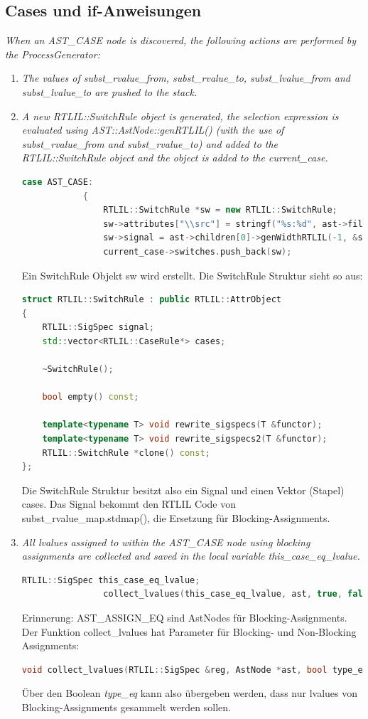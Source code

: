 \documentclass[11pt]{report}
\begin{document}
\subsection{Cases und if-Anweisungen}

\textit{When an AST\_CASE node is discovered, the following actions are performed by the ProcessGenerator:}
\begin{enumerate}
  \item \textit{The values of subst\_rvalue\_from, subst\_rvalue\_to, subst\_lvalue\_from and subst\_lvalue\_to are pushed to the stack.}

  
\item \textit{A new RTLIL::SwitchRule object is generated, the selection expression is evaluated using AST::AstNode::genRTLIL() (with the use of subst\_rvalue\_from and subst\_rvalue\_to) and added to the RTLIL::SwitchRule object and the object is added to the current\_case.}
  \begin{lstlisting}[language=C++]
  	case AST_CASE:
			{
				RTLIL::SwitchRule *sw = new RTLIL::SwitchRule;
				sw->attributes["\\src"] = stringf("%s:%d", ast->filename.c_str(), ast->linenum);
				sw->signal = ast->children[0]->genWidthRTLIL(-1, &subst_rvalue_map.stdmap());
				current_case->switches.push_back(sw);
  \end{lstlisting}
  Ein SwitchRule Objekt sw wird erstellt.
  Die SwitchRule Struktur sieht so aus:
  \begin{lstlisting}[language=C++]
  	struct RTLIL::SwitchRule : public RTLIL::AttrObject
{
	RTLIL::SigSpec signal;
	std::vector<RTLIL::CaseRule*> cases;

	~SwitchRule();

	bool empty() const;

	template<typename T> void rewrite_sigspecs(T &functor);
	template<typename T> void rewrite_sigspecs2(T &functor);
	RTLIL::SwitchRule *clone() const;
};
  \end{lstlisting}
  Die SwitchRule Struktur besitzt also ein Signal und einen Vektor (Stapel) cases.
  Das Signal bekommt den RTLIL Code von subst\_rvalue\_map.stdmap(), die Ersetzung für Blocking-Assignments.

\item \textit{All lvalues assigned to within the AST\_CASE node using blocking assignments are collected and saved in the local variable this\_case\_eq\_lvalue.}
\begin{lstlisting}[language=C++]
RTLIL::SigSpec this_case_eq_lvalue;
				collect_lvalues(this_case_eq_lvalue, ast, true, false);
\end{lstlisting}
Erinnerung: AST\_ASSIGN\_EQ sind AstNodes für Blocking-Assignments.
Der Funktion collect\_lvalues hat Parameter für Blocking- und Non-Blocking Assignments:
\begin{lstlisting}[language=C++]
void collect_lvalues(RTLIL::SigSpec &reg, AstNode *ast, bool type_eq, bool type_le, bool run_sort_and_unify = true)
\end{lstlisting}
Über den Boolean \textit{type\_eq} kann also übergeben werden, dass nur lvalues von Blocking-Assignments gesammelt werden sollen. 



\end{enumerate}
\end{document}
